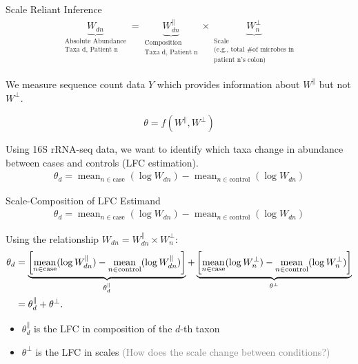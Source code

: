 \documentclass{beamer}
\DeclareMathOperator*{\mean}{mean}
\begin{document}
\begin{frame}[label={sec:org82e28ba}]{Scale Reliant Inference}
\begin{align*}
  \underbrace{W_{dn}}_{\substack{\text{Absolute Abundance} \\ \text{Taxa d, Patient n}}} = \underbrace{W^\parallel_{dn}}_{\substack{\text{Composition} \\ \text{Taxa d, Patient n} }} \times \underbrace{W^\perp_n}_{\substack{\text{Scale} \\ \text{(e.g., total \# of microbes in} \\ \text{patient n's colon)}}}
\end{align*}

\pause
We measure sequence count data \(Y\) which provides information about \(W^{\parallel}\) but not \(W^{\perp}\).

\pause

\[\theta=f(W^{\parallel}, W^{\perp})\]
\pause
\begin{example}\label{sec:orgd8e844c}
Using 16S rRNA-seq data, we want to identify which taxa change in abundance between cases and controls (LFC estimation).
\begin{align*}
  \theta_d = \mean_{n \in \text{case}}(\log W_{dn}) - \mean_{n \in \text{control}}(\log W_{dn} )
\end{align*}
\end{example}
\end{frame}
\begin{frame}[label={sec:org77ed647}]{Scale-Composition of LFC Estimand}
\begin{align*}
  \theta_d = \mean_{n \in \text{case}}(\log W_{dn}) - \mean_{n \in \text{control}}(\log W_{dn} )
\end{align*}


Using the relationship \(W_{dn} = W^\parallel_{dn} \times W^\perp_n\):
\small
\begin{align*}
  \small
  \theta_{d} &=  \underbrace{\left[\mean_{n \in \text{case}}(\log W^{\parallel}_{dn}) - \mean_{n \in \text{control}}(\log
  W^{\parallel}_{dn})\right]}_{\theta^\parallel_d}+\underbrace{\left[\mean_{n \in \text{case}}(\log W^{\perp}_{n}) - \mean_{n \in \text{control}}(\log W^{\perp}_{n})\right]}_{\theta^\perp} \label{eq:diff-analysis-2} \\
                       &= \theta_{d}^{\parallel}+\theta^\perp. \nonumber
\end{align*}

\pause

\begin{itemize}
\item \(\theta^{\parallel}_{d}\) is the LFC in composition of the \(d\)-th taxon
\item \(\theta^{\perp}\) is the LFC in scales \textcolor{gray}{(How does the scale change between conditions?)}
\end{itemize}
\end{frame}
\end{document}
